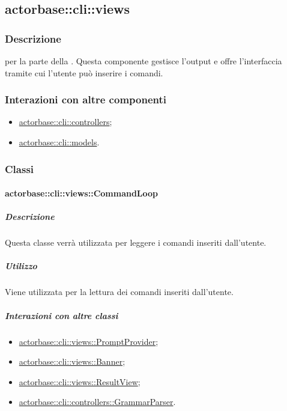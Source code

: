 \documentclass{scalatekids-article}
\begin{document}
\subsection{actorbase::cli::views}
\label{sec:actorbase::cli::views}

\subsubsection{Descrizione}

 per la parte  della . Questa componente
gestisce l'output e offre l'interfaccia tramite cui l'utente può inserire i
comandi.

\subsubsection{Interazioni con altre componenti}

\begin{itemize}
\item \hyperref[sec:actorbase::cli::controllers]{actorbase::cli::controllers};
\item \hyperref[sec:actorbase::cli::models]{actorbase::cli::models}.
\end{itemize}

\subsubsection{Classi}

\paragraph{actorbase::cli::views::CommandLoop}
\label{sec:actorbase::cli::views::CommandLoop}

\subparagraph{Descrizione}

Questa classe verrà utilizzata per leggere i comandi inseriti dall'utente.

\subparagraph{Utilizzo}

Viene utilizzata per la lettura dei comandi inseriti dall'utente.

\subparagraph{Interazioni con altre classi}

\begin{itemize}
\item \hyperref[sec:actorbase::cli::views::PromptProvider]{actorbase::cli::views::PromptProvider};
\item \hyperref[sec:actorbase::cli::views::Banner]{actorbase::cli::views::Banner};
\item \hyperref[sec:actorbase::cli::views::ResultView]{actorbase::cli::views::ResultView};
\item \hyperref[sec:actorbase::cli::controllers::GrammarParser]{actorbase::cli::controllers::GrammarParser}.
\end{itemize}
\end{document}
